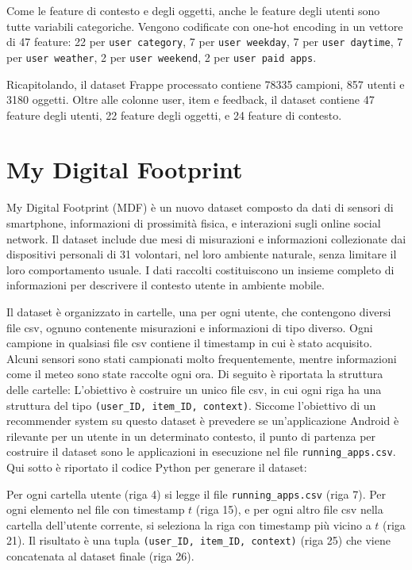 \documentclass[12pt,italian]{report}
\begin{document}
\bigskip \noindent
Come le feature di contesto e degli oggetti, anche le feature degli utenti sono tutte variabili categoriche. Vengono codificate con one-hot encoding in un vettore di 47 feature: 22 per \texttt{user category}, 7 per \texttt{user weekday}, 7 per \texttt{user daytime}, 7 per \texttt{user weather}, 2 per \texttt{user weekend}, 2 per \texttt{user paid apps}.

Ricapitolando, il dataset Frappe processato contiene 78335 campioni, 857 utenti e 3180 oggetti. Oltre alle colonne user, item e feedback, il dataset contiene 47 feature degli utenti, 22 feature degli oggetti, e 24 feature di contesto.

\section{My Digital Footprint}
My Digital Footprint (MDF) \cite{mdf} è un nuovo dataset composto da dati di sensori di smartphone, informazioni di prossimità fisica, e interazioni sugli online social network. Il dataset include due mesi di misurazioni e informazioni collezionate dai dispositivi personali di 31 volontari, nel loro ambiente naturale, senza limitare il loro comportamento usuale. I dati raccolti costituiscono un insieme completo di informazioni per descrivere il contesto utente in ambiente mobile. 

Il dataset è organizzato in cartelle, una per ogni utente, che contengono diversi file csv, ognuno contenente misurazioni e informazioni di tipo diverso. Ogni campione in qualsiasi file csv contiene il timestamp in cui è stato acquisito. Alcuni sensori sono stati campionati molto frequentemente, mentre informazioni come il meteo sono state raccolte ogni ora.
Di seguito è riportata la struttura delle cartelle:
\noindent
L'obiettivo è costruire un unico file csv, in cui ogni riga ha una struttura del tipo \texttt{(user\_ID, item\_ID, context)}. Siccome l'obiettivo di un recommender system su questo dataset è prevedere se un'applicazione Android è rilevante per un utente in un determinato contesto, il punto di partenza per costruire il dataset sono le applicazioni in esecuzione nel file \texttt{running\_apps.csv}. Qui sotto è riportato il codice Python per generare il dataset: 

Per ogni cartella utente (riga 4) si legge il file \texttt{running\_apps.csv} (riga 7). Per ogni elemento nel file con timestamp $t$ (riga 15), e per ogni altro file csv nella cartella dell'utente corrente, si seleziona la riga con timestamp più vicino a $t$ (riga 21). Il risultato è una tupla \texttt{(user\_ID, item\_ID, context)} (riga 25) che viene concatenata al dataset finale (riga 26).
\end{document}
